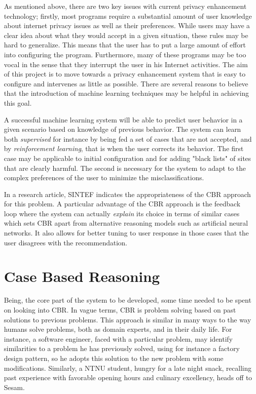 As mentioned above, there are two key issues with current privacy enhancement technology; firstly, most programs require a substantial amount of user knowledge about internet privacy issues as well as their preferences. While users may have a clear idea about what they would accept in a given situation, these rules may be hard to generalize. This means that the user has to put a large amount of effort into configuring the program. Furthermore, many of these programs may be too vocal in the sense that they interrupt the user in his Internet activities. The aim of this project is to move towards a privacy enhancement system that is easy to configure and intervenes as little as possible. There are several reasons to believe that the introduction of machine learning techniques may be helpful in achieving this goal.

A successful machine learning system will be able to predict user behavior in a given scenario based on knowledge of previous behavior. The system can learn both \emph{supervised} for instance by being fed a set of cases that are not accepted, and by \emph{reinforcement learning}, that is when the user corrects its behavior. The first case may be applicable to initial configuration and for adding "black lists" of sites that are clearly harmful. The second is necessary for the system to adapt to the complex preferences of the user to minimize the misclassifications.

In a research article, SINTEF indicates the appropriateness of the CBR approach for this problem. A particular advantage of the CBR approach is the feedback loop where the system can actually \emph{explain} its choice in terms of similar cases which sets CBR apart from alternative reasoning models such as artificial neural networks. It also allows for better tuning to user response in those cases that the user disagrees with the recommendation.

\section{Case Based Reasoning}
Being, the core part of the system to be developed, some time needed to be spent on looking into CBR. In vague terms, CBR is problem solving based on past solutions to previous problems. This approach is similar in many ways to the way humans solve problems, both as domain experts, and in their daily life. For instance, a software engineer, faced with a particular problem, may identify similarities to a problem he has previously solved, using for instance a factory design pattern, so he adopts this solution to the new problem with some modifications. Similarly, a NTNU student, hungry for a late night snack, recalling past experience with favorable opening hours and culinary excellency, heads off to Sesam.

